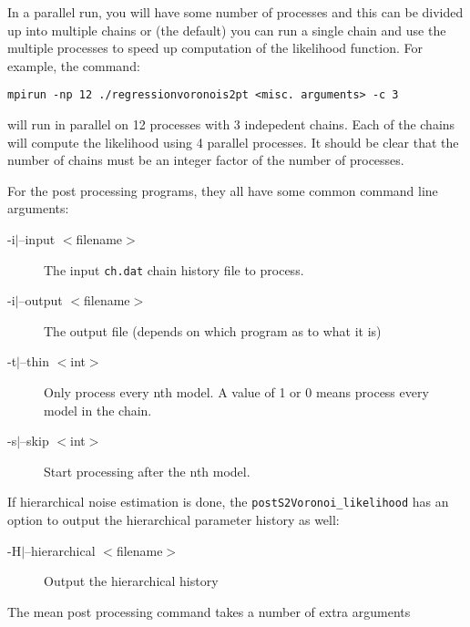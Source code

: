 \documentclass{article}
\begin{document}
In a parallel run, you will have some number of processes and this can be divided up
into multiple chains or (the default) you can run a single chain and use the
multiple processes to speed up computation of the likelihood function. For example,
the command:

\begin{verbatim}
mpirun -np 12 ./regressionvoronois2pt <misc. arguments> -c 3
\end{verbatim}

will run in parallel on 12 processes with 3 indepedent chains. Each of the chains
will compute the likelihood using 4 parallel processes. It should be clear that
the number of chains must be an integer factor of the number of processes.

For the post processing programs, they all have some common command line arguments:

\begin{description}
\item[-i$|$--input $<$filename$>$] The input {\tt ch.dat} chain history file to process.
\item[-i$|$--output $<$filename$>$] The output file (depends on which program as to what it is)
\item[-t$|$--thin $<$int$>$] Only process every nth model. A value of 1 or 0 means process every
  model in the chain.
\item[-s$|$--skip $<$int$>$] Start processing after the nth model.
\end{description}

If hierarchical noise estimation is done, the {\tt postS2Voronoi\_likelihood} has an option
to output the hierarchical parameter history as well:

\begin{description}
\item[-H$|$--hierarchical $<$filename$>$] Output the hierarchical history
\end{description}

The mean post processing command takes a number of extra arguments
\end{document}
